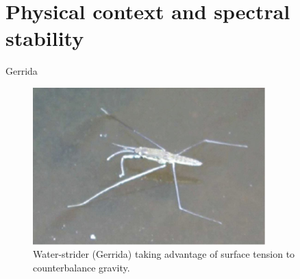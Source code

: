 \documentclass[9pt, english]{beamer}
\theoremstyle{definition}
\begin{document}

\section{Physical context and spectral stability}


\begin{frame}{Gerrida}
\begin{figure}\label{fig:gerrida}
        \includegraphics[width=0.8\textwidth]{images/Fig31Chardard2.pdf}
\caption{Water-strider (Gerrida) taking advantage of surface tension
        to counterbalance gravity.}
        \end{figure}
\end{frame}
\end{document}
